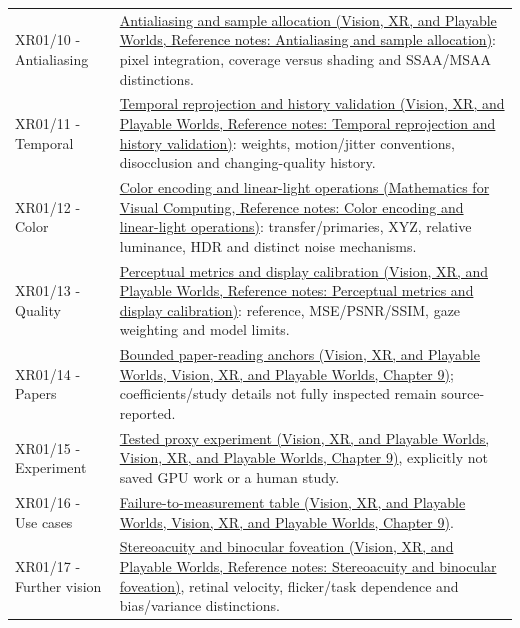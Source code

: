 {\begin{longtable}[]{@{}
  >{\raggedright\arraybackslash}p{}
  >{\raggedright\arraybackslash}p{}@{}}
XR01/10 - Antialiasing & \href{../07-Vision-XR-and-Playable-Worlds/main.pdf\#nameddest=appendix-4192b2bdd21e}{Antialiasing and sample allocation (Vision, XR, and Playable Worlds, Reference notes: Antialiasing and sample allocation)}: pixel integration, coverage versus shading and SSAA/MSAA distinctions. \\
XR01/11 - Temporal & \href{../07-Vision-XR-and-Playable-Worlds/main.pdf\#nameddest=appendix-0727340a4428}{Temporal reprojection and history validation (Vision, XR, and Playable Worlds, Reference notes: Temporal reprojection and history validation)}: weights, motion/jitter conventions, disocclusion and changing-quality history. \\
XR01/12 - Color & \href{../02-Mathematics-for-Visual-Computing/main.pdf\#nameddest=appendix-a9f83ad40792}{Color encoding and linear-light operations (Mathematics for Visual Computing, Reference notes: Color encoding and linear-light operations)}: transfer/primaries, XYZ, relative luminance, HDR and distinct noise mechanisms. \\
XR01/13 - Quality & \href{../07-Vision-XR-and-Playable-Worlds/main.pdf\#nameddest=appendix-b2c1846508bf}{Perceptual metrics and display calibration (Vision, XR, and Playable Worlds, Reference notes: Perceptual metrics and display calibration)}: reference, MSE/PSNR/SSIM, gaze weighting and model limits. \\
XR01/14 - Papers & \href{../07-Vision-XR-and-Playable-Worlds/main.pdf\#nameddest=04-visual-computing-ii-ch042-read-research-as-a-chain-of-questions-methods-and-bounded-conclusions}{Bounded paper-reading anchors (Vision, XR, and Playable Worlds, Vision, XR, and Playable Worlds, Chapter 9)}; coefficients/study details not fully inspected remain source-reported. \\
XR01/15 - Experiment & \href{../07-Vision-XR-and-Playable-Worlds/main.pdf\#nameddest=04-visual-computing-ii-ch042-complete-numerical-and-image-space-laboratory}{Tested proxy experiment (Vision, XR, and Playable Worlds, Vision, XR, and Playable Worlds, Chapter 9)}, explicitly not saved GPU work or a human study. \\
XR01/16 - Use cases & \href{../07-Vision-XR-and-Playable-Worlds/main.pdf\#nameddest=04-visual-computing-ii-ch042-diagnose-a-symptom-by-the-quantity-that-failed}{Failure-to-measurement table (Vision, XR, and Playable Worlds, Vision, XR, and Playable Worlds, Chapter 9)}. \\
XR01/17 - Further vision & \href{../07-Vision-XR-and-Playable-Worlds/main.pdf\#nameddest=appendix-8dc848f14052}{Stereoacuity and binocular foveation (Vision, XR, and Playable Worlds, Reference notes: Stereoacuity and binocular foveation)}, retinal velocity, flicker/task dependence and bias/variance distinctions. \\

\end{longtable}}
